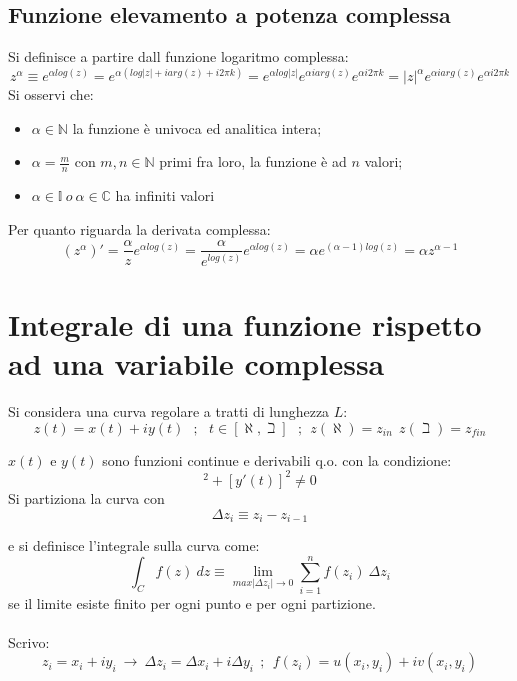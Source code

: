 \documentclass[twoside]{article}
\begin{document}
    \subsection{Funzione elevamento a potenza complessa}
    Si definisce a partire dall funzione logaritmo complessa:
    \begin{equation}
        z^\alpha\equiv e^{\alpha log(z)}=e^{\alpha(log|z|+iarg(z)+i2\pi k)}=e^{\alpha log|z|}e^{\alpha iarg(z)}e^{\alpha i2\pi k}=|z|^\alpha e^{\alpha iarg(z)}e^{\alpha i2\pi k}
    \end{equation}
    Si osservi che:
    \begin{itemize}
        \item $\alpha \in \mathds{N}$ la funzione è univoca ed analitica intera;
        \item $\alpha=\frac{m}{n}$ con $m,n \in \mathds{N}$ primi fra loro, la funzione è ad $n$ valori;
        \item $\alpha\in \mathds{I}\ o\ \alpha\in \mathds{C}$ ha infiniti valori
    \end{itemize}
    Per quanto riguarda la derivata complessa:
    \begin{equation}
        (z^\alpha)'=\frac{\alpha}{z}e^{\alpha log(z)}=\frac{\alpha}{e^{log(z)}}e^{\alpha log(z)}=\alpha e^{(\alpha-1) log(z)}=\alpha z^{\alpha-1}
    \end{equation}
\newpage

\setcounter{section}{3}

\section{Integrale di una funzione rispetto ad una variabile complessa}

Si considera una curva regolare a tratti di lunghezza $L$:
\begin{equation}
    z(t)=x(t)+iy(t) \ \ \ ; \ \ \ t \in [\aleph,\beth] \ \ \ ; \ \ z(\aleph)=z_{in} \ \ z(\beth)=z_{fin}
\end{equation}

$x(t)$ e $y(t)$ sono funzioni continue e derivabili q.o. con la condizione:
\begin{equation}
    [x'(t)]^2 + [y'(t)]^2 \ne 0
\end{equation}
Si partiziona la curva con
\begin{equation}
    \Delta z_i \equiv z_i - z_{i-1}
\end{equation}

e si definisce l'integrale sulla curva come:
\begin{equation}
    \int_C f(z) \ dz \equiv \lim_{max|\Delta z_i| \to 0} \sum_{i=1} ^n f(z_i) \ \Delta z_i
\end{equation}
se il limite esiste finito per ogni punto e per ogni partizione. \\ \\
Scrivo:\begin{equation}
    z_i=x_i+iy_i \ \rightarrow \ \Delta z_i=\Delta x_i +i\Delta y_i \ \ ; \ \ f(z_i)=u(x_i,y_i)+iv(x_i,y_i)
\end{equation}
\end{document}
